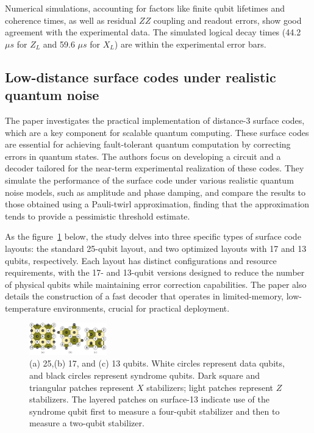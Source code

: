Numerical simulations, accounting for factors like finite qubit lifetimes and coherence times, as well as residual $ZZ$ coupling and readout errors, show good agreement with the experimental data. The simulated logical decay times (44.2 $\mu s$ for $Z_L$ and 59.6 $\mu s$ for $X_L$) are within the experimental error bars.

\subsection{Low-distance surface codes under realistic quantum noise}

The paper investigates the practical implementation of distance-3 surface codes, which are a key component for scalable quantum computing. These surface codes are essential for achieving fault-tolerant quantum computation by correcting errors in quantum states. The authors focus on developing a circuit and a decoder tailored for the near-term experimental realization of these codes. They simulate the performance of the surface code under various realistic quantum noise models, such as amplitude and phase damping, and compare the results to those obtained using a Pauli-twirl approximation, finding that the approximation tends to provide a pessimistic threshold estimate.

As the figure~\ref{fig:25_qubits} below, the study delves into three specific types of surface code layouts: the standard 25-qubit layout, and two optimized layouts with 17 and 13 qubits, respectively. Each layout has distinct configurations and resource requirements, with the 17- and 13-qubit versions designed to reduce the number of physical qubits while maintaining error correction capabilities. The paper also details the construction of a fast decoder that operates in limited-memory, low-temperature environments, crucial for practical deployment.
\begin{figure}[h]
    \centering
    \includegraphics[width=0.3\textwidth]{sections/5_practical_implementation/25_qubits.jpg}
    \caption{(a) 25,(b) 17, and (c) 13 qubits. White circles represent data qubits, and black circles represent syndrome qubits. Dark square and triangular patches represent $X$ stabilizers; light patches represent $Z$ stabilizers. The layered patches on surface-13 indicate use of the syndrome qubit first to measure a four-qubit stabilizer and then to measure a two-qubit stabilizer.}
    \label{fig:25_qubits}
\end{figure}

